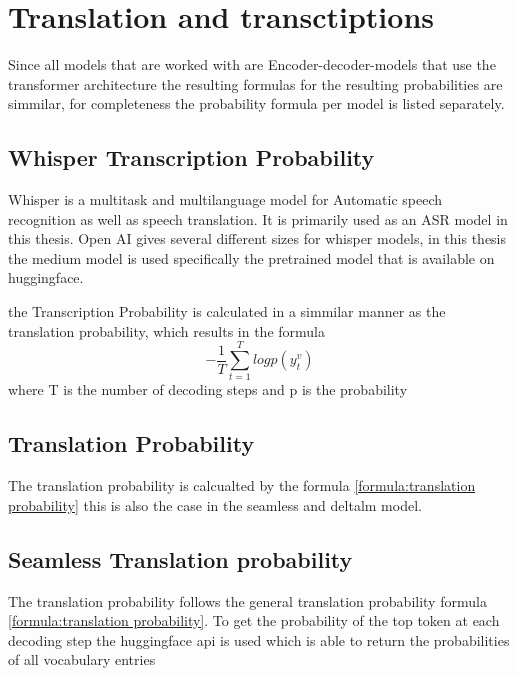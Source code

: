 




\chapter{Translation and transctiptions}
Since all models that are worked with are Encoder-decoder-models that use the transformer architecture the resulting formulas for the resulting probabilities are simmilar, for completeness the probability formula per model is listed separately. 

\section{Whisper Transcription Probability}
Whisper \cite{radford2022robust} is a multitask and multilanguage model for Automatic speech recognition as well as speech translation. It is primarily used as an ASR model in this thesis. Open AI gives several different sizes for whisper models, in this thesis the medium model is used specifically the pretrained model that is available on huggingface. 


the Transcription Probability is calculated in a simmilar manner as the translation probability, which results in the formula $$-\frac{1}{T}\sum_{t=1}^T log p(y_t^v)$$ where T is the number of decoding steps and p is the probability 


\section{Translation Probability}
The translation probability is calcualted by the formula \ref{formula:translation probability} this is also the case in the seamless and deltalm model. 


\section{Seamless Translation probability}
The translation probability follows the general translation probability formula \ref{formula:translation probability}. To get the probability of the top token at each decoding step the huggingface api is used which is able to return the probabilities of all vocabulary entries 

